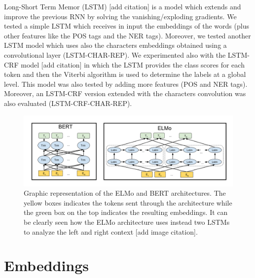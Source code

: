 \documentclass[11pt,a4paper]{article}
\begin{document}
Long-Short Term Memor (LSTM) [add citation] is a model which extends and improve the previous RNN by solving the vanishing/exploding gradients. We tested a simple LSTM which receives in input the embeddings of the words (plus other features like the POS tags and the NER tags). Moreover, we tested another LSTM model which uses also the characters embeddings obtained using a convolutional layer (LSTM-CHAR-REP). 
We experimented also with the LSTM-CRF model [add citation] in which the LSTM provides the class scores for each token and then the Viterbi algorithm is used to determine the labels at a global level. This model was also tested by adding more features (POS and NER tags). Moreover, an LSTM-CRF version extended with the characters convolution was also evaluated (LSTM-CRF-CHAR-REP).


\begin{figure}
\includegraphics[width=\linewidth]{img/bert-elmo-2.png}
\caption{Graphic representation of the ELMo and BERT architectures. The yellow boxes indicates the tokens sent through the architecture while the green box on the top indicates the resulting embeddings. It can be clearly seen how the ELMo architecture uses instead two LSTMs to analyze the left and right context [add image citation].}
\end{figure}



\section{Embeddings}
\end{document}
